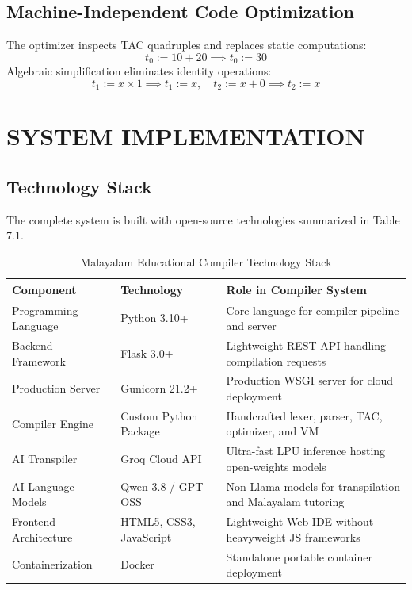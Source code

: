 \documentclass[12pt,a4paper]{report}
\begin{document}
\section{Machine-Independent Code Optimization}
The optimizer inspects TAC quadruples and replaces static computations:
\begin{equation}
    t_0 := 10 + 20 \implies t_0 := 30
\end{equation}
Algebraic simplification eliminates identity operations:
\begin{equation}
    t_1 := x \times 1 \implies t_1 := x, \quad t_2 := x + 0 \implies t_2 := x
\end{equation}

\newpage
\chapter{SYSTEM IMPLEMENTATION}

\section{Technology Stack}
The complete system is built with open-source technologies summarized in Table 7.1.

\begin{table}[htbp]
    \centering
    \caption{Malayalam Educational Compiler Technology Stack}
    \label{tab:techstack}
    \vspace{0.2cm}
    \begin{tabularx}{\textwidth}{llX}
        \toprule
        \textbf{Component} & \textbf{Technology} & \textbf{Role in Compiler System} \\
        \midrule
        Programming Language & Python 3.10+ & Core language for compiler pipeline and server \\
        Backend Framework & Flask 3.0+ & Lightweight REST API handling compilation requests \\
        Production Server & Gunicorn 21.2+ & Production WSGI server for cloud deployment \\
        Compiler Engine & Custom Python Package & Handcrafted lexer, parser, TAC, optimizer, and VM \\
        AI Transpiler & Groq Cloud API & Ultra-fast LPU inference hosting open-weights models \\
        AI Language Models & Qwen 3.8 / GPT-OSS & Non-Llama models for transpilation and Malayalam tutoring \\
        Frontend Architecture & HTML5, CSS3, JavaScript & Lightweight Web IDE without heavyweight JS frameworks \\
        Containerization & Docker & Standalone portable container deployment \\
        \bottomrule
    \end{tabularx}
\end{table}
\end{document}

